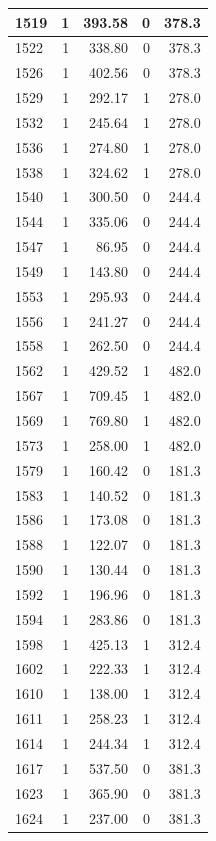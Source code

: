 \documentclass[
  spanish,
  12pt,
]{book}
\begin{document}
\begin{tabular}{l|r|r|r|r}
\hline
1519 & 1 & 393.58 & 0 & 378.3\\
\hline
1522 & 1 & 338.80 & 0 & 378.3\\
\hline
1526 & 1 & 402.56 & 0 & 378.3\\
\hline
1529 & 1 & 292.17 & 1 & 278.0\\
\hline
1532 & 1 & 245.64 & 1 & 278.0\\
\hline
1536 & 1 & 274.80 & 1 & 278.0\\
\hline
1538 & 1 & 324.62 & 1 & 278.0\\
\hline
1540 & 1 & 300.50 & 0 & 244.4\\
\hline
1544 & 1 & 335.06 & 0 & 244.4\\
\hline
1547 & 1 & 86.95 & 0 & 244.4\\
\hline
1549 & 1 & 143.80 & 0 & 244.4\\
\hline
1553 & 1 & 295.93 & 0 & 244.4\\
\hline
1556 & 1 & 241.27 & 0 & 244.4\\
\hline
1558 & 1 & 262.50 & 0 & 244.4\\
\hline
1562 & 1 & 429.52 & 1 & 482.0\\
\hline
1567 & 1 & 709.45 & 1 & 482.0\\
\hline
1569 & 1 & 769.80 & 1 & 482.0\\
\hline
1573 & 1 & 258.00 & 1 & 482.0\\
\hline
1579 & 1 & 160.42 & 0 & 181.3\\
\hline
1583 & 1 & 140.52 & 0 & 181.3\\
\hline
1586 & 1 & 173.08 & 0 & 181.3\\
\hline
1588 & 1 & 122.07 & 0 & 181.3\\
\hline
1590 & 1 & 130.44 & 0 & 181.3\\
\hline
1592 & 1 & 196.96 & 0 & 181.3\\
\hline
1594 & 1 & 283.86 & 0 & 181.3\\
\hline
1598 & 1 & 425.13 & 1 & 312.4\\
\hline
1602 & 1 & 222.33 & 1 & 312.4\\
\hline
1610 & 1 & 138.00 & 1 & 312.4\\
\hline
1611 & 1 & 258.23 & 1 & 312.4\\
\hline
1614 & 1 & 244.34 & 1 & 312.4\\
\hline
1617 & 1 & 537.50 & 0 & 381.3\\
\hline
1623 & 1 & 365.90 & 0 & 381.3\\
\hline
1624 & 1 & 237.00 & 0 & 381.3\\

\end{tabular}
\end{document}

